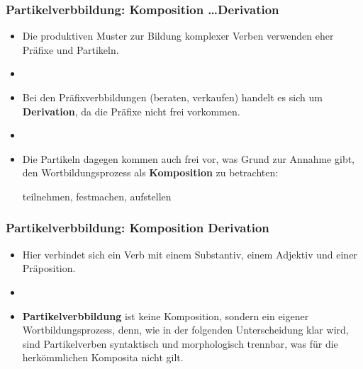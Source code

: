 
\begin{frame}
\frametitle{Partikelverbbildung: Komposition \dots Derivation}

\begin{itemize}
	\item Die produktiven Muster zur Bildung komplexer Verben verwenden eher Präfixe und Partikeln.
	\item[]
	\item Bei den Präfixverbbildungen (beraten, verkaufen) handelt es sich um \textbf{Derivation}, da die Präfixe nicht frei vorkommen.
	\item[]
	\item Die Partikeln dagegen kommen auch frei vor, was Grund zur Annahme gibt, den Wortbildungsprozess als \textbf{Komposition} zu betrachten:
	
	\ea teilnehmen, festmachen, aufstellen
	\z
	
\end{itemize}

\end{frame}




\begin{frame}
\frametitle{Partikelverbbildung: Komposition \vs Derivation}

\begin{itemize}
	\item Hier verbindet sich ein Verb mit einem Substantiv, einem Adjektiv und einer Präposition.
	\item[]
	\item \textbf{Partikelverbbildung} ist keine Komposition, sondern ein eigener Wortbildungsprozess, denn, wie in der folgenden Unterscheidung klar wird, sind Partikelverben syntaktisch und morphologisch trennbar, was für die herkömmlichen Komposita nicht gilt.
\end{itemize}


\end{frame}




